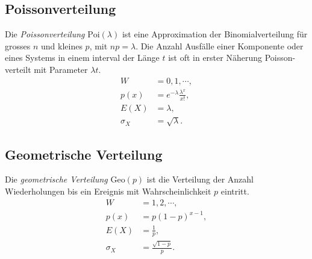 \subsection{Poissonverteilung}
Die \emph{Poissonverteilung} $\mathrm{Poi}(\lambda)$ ist eine Approximation der Binomialverteilung für grosses $n$ und kleines $p$, mit $np = \lambda$. Die Anzahl Ausfälle einer Komponente oder eines Systems in einem interval der Länge $t$ ist oft in erster Näherung Poisson-verteilt mit Parameter $\lambda t$.
\begin{align*}
	W &= {0,1,\cdots},\\
	p(x) &= e^{-\lambda} \frac{\lambda^x}{x!},\\
	E(X) &= \lambda,\\
	\sigma_X &= \sqrt{\lambda}.
\end{align*}
\subsection{Geometrische Verteilung}
Die \emph{geometrische Verteilung} $\mathrm{Geo}(p)$ ist die Verteilung der Anzahl Wiederholungen bis ein Ereignis mit Wahrscheinlichkeit $p$ eintritt.
\begin{align*}
	W &= {1,2,\cdots},\\
	p(x) &= p(1-p)^{x-1},\\
	E(X) &= \frac{1}{p},\\
	\sigma_X &= \frac{\sqrt{1-p}}{p}.
\end{align*}
